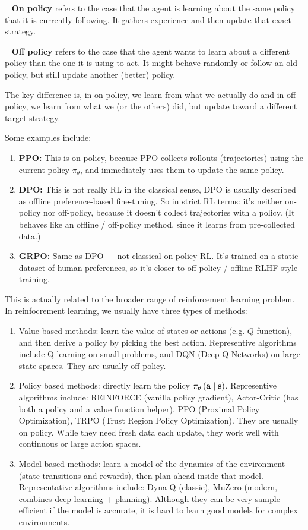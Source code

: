 \documentclass[11pt]{article}  %
\begin{document}
\textbullet~ \textbf{On policy} refers to the case that the agent is learning about the same policy that it is currently following. 
It gathers experience and then update that exact strategy.

\textbullet~ \textbf{Off policy} refers to the case that the agent wants to learn about a different policy than the one it is using to act. 
It might behave randomly or follow an old policy, but still update another (better) policy.

The key difference is, in on policy, we learn from what we actually do and in off policy, we learn from what we (or the others) did, but update toward a different target strategy.

Some examples include: 
\begin{enumerate}
  \item \textbf{PPO:} This is on policy, because PPO collects rollouts (trajectories) using the current policy $\pi_{\theta}$, and immediately uses them to update the same policy.
  \item \textbf{DPO:} This is not really RL in the classical sense, DPO is usually described as offline preference-based fine-tuning. 
  So in strict RL terms: it's neither on-policy nor off-policy, because it doesn't collect trajectories with a policy. (It behaves like an offline / off-policy method, since it learns from pre-collected data.)
  \item \textbf{GRPO:} Same as DPO — not classical on-policy RL. 
  It's trained on a static dataset of human preferences, so it's closer to off-policy / offline RLHF-style training.
\end{enumerate}

This is actually related to the broader range of reinforcement learning problem. 
In reinfocrement learning, we usually have three types of methods:
\begin{enumerate}
  \item Value based methods: learn the value of states or actions (e.g. $Q$ function), and then derive a policy by picking the best action. 
  Representive algorithms include Q-learning on small problems, and DQN (Deep-Q Networks) on large state spaces. 
  They are usually off-policy.

  \item Policy based methods: directly learn the policy $\pi_{\theta}\left( \mathbf{a} \mid \mathbf{s} \right)$. 
  Representive algorithms include: REINFORCE (vanilla policy gradient), Actor-Critic (has both a policy and a value function helper), PPO (Proximal Policy Optimization), TRPO (Trust Region Policy Optimization).
  They are usually on policy. 
  While they need fresh data each update, they work well with continuous or large action spaces.

  \item Model based methods: learn a model of the dynamics of the environment (state transitions and rewards), then plan ahead inside that model.
  Representative algorithms include: Dyna-Q (classic), MuZero (modern, combines deep learning + planning). 
  Although they can be very sample-efficient if the model is accurate, it is hard to learn good models for complex environments.
\end{enumerate}
\end{document}
